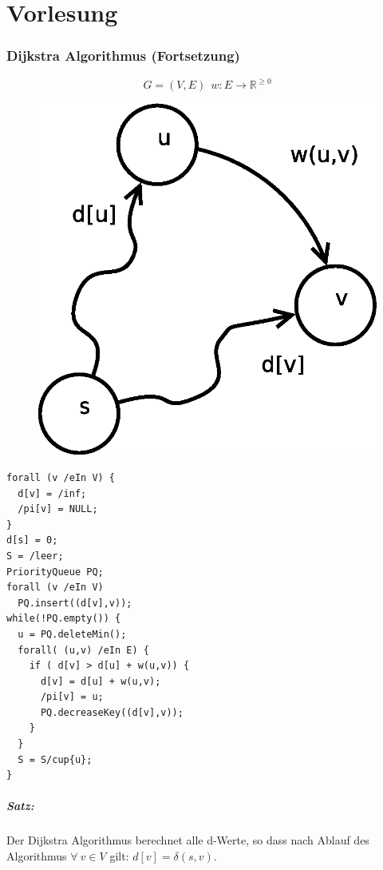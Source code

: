 \chapter{Vorlesung}
\subsection*{Dijkstra Algorithmus (Fortsetzung)}
\[ G=(V,E)~~ w:E\rightarrow \mathbb{R}^{\geq0} \]
\begin{figure}
	\centering
	\includegraphics[width=\linewidth]{17/Grafik/Skizze}
	\caption{}
	\label{fig:Skizze}
\end{figure}
\begin{lstlisting}[style = pseudo]
forall (v /eIn V) {
  d[v] = /inf;
  /pi[v] = NULL;
}
d[s] = 0;
S = /leer;
PriorityQueue PQ;
forall (v /eIn V)
  PQ.insert((d[v],v));
while(!PQ.empty()) {
  u = PQ.deleteMin();
  forall( (u,v) /eIn E) {
    if ( d[v] > d[u] + w(u,v)) {
      d[v] = d[u] + w(u,v);
      /pi[v] = u;
      PQ.decreaseKey((d[v],v));
    }
  }
  S = S/cup{u};
}
\end{lstlisting}

\paragraph{Satz:}
Der Dijkstra Algorithmus berechnet alle d-Werte, so dass nach Ablauf des Algorithmus $\forall~v\in V$ gilt: $d[v] = \delta(s,v)$.
\pagebreak

